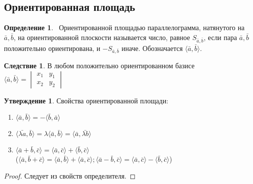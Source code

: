 \documentclass[a4paper, 12pt]{article}
\theoremstyle{definition}
\newtheorem*{definition}{Определение}
\newtheorem*{consequense}{Следствие}
\newtheorem*{subtheorem}{Утверждение}
\begin{document}
	\subsection{Ориентированная площадь}
	\begin{definition}
		\ Ориентированной площадью параллелограмма, натянутого на $\bar{a},\bar{b}$, на ориентированной плоскости называется число, равное $S_{\bar{a},\bar{b}}$, если пара $\bar{a},\bar{b}$ положительно ориентирована, и $-S_{\bar{a},\bar{b}}$ иначе. Обозначается $\langle\bar{a}, \bar{b}\rangle$.
	\end{definition}
	\begin{consequense}
		В любом положительно ориентированном базисе $\langle\bar{a}, \bar{b}\rangle = \begin{vmatrix} x_1&y_1\\x_2&y_2 \end{vmatrix}$
	\end{consequense}
	\begin{subtheorem} Свойства ориентированной площади:
		\begin{enumerate}
			\item $\langle\bar{a}, \bar{b}\rangle = -\langle\bar{b}, \bar{a}\rangle$
			\item $\langle\bar{\lambda a}, \bar{b}\rangle = \lambda\langle\bar{a}, \bar{b}\rangle = \langle\bar{a}, \bar{\lambda b}\rangle$
			\item $\langle\bar{a} + \bar{b}, \bar{c}\rangle = \langle\bar{a}, \bar{c}\rangle + \langle\bar{b}, \bar{c}\rangle$\\
			($\langle\bar{a}, \bar{b} + \bar{c}\rangle = \langle\bar{a}, \bar{b}\rangle + \langle\bar{a}, \bar{c}\rangle; \langle\bar{a} - \bar{b}, \bar{c}\rangle = \langle\bar{a}, \bar{c}\rangle-\langle\bar{b}, \bar{c}\rangle$)
		\end{enumerate}
	\end{subtheorem}
	\begin{proof}
		Следует из свойств определителя.
	\end{proof}
\end{document}
